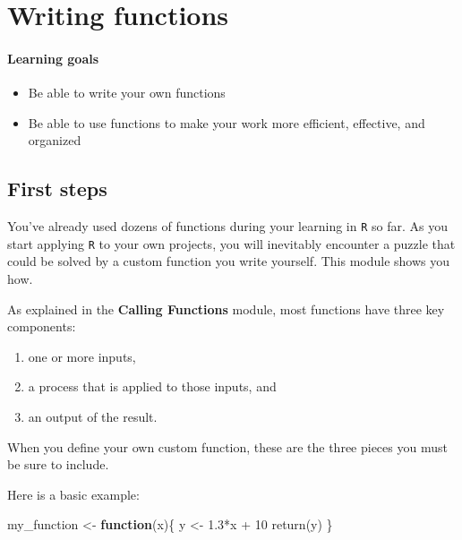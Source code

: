 \documentclass[
]{book}
\newenvironment{Shaded}{\begin{snugshade}}{\end{snugshade}}
\newcommand{\ControlFlowTok}[1]{\textcolor[rgb]{0.13,0.29,0.53}{\textbf{#1}}}
\newcommand{\DecValTok}[1]{\textcolor[rgb]{0.00,0.00,0.81}{#1}}
\newcommand{\FloatTok}[1]{\textcolor[rgb]{0.00,0.00,0.81}{#1}}
\newcommand{\FunctionTok}[1]{\textcolor[rgb]{0.00,0.00,0.00}{#1}}
\newcommand{\NormalTok}[1]{#1}
\newcommand{\OtherTok}[1]{\textcolor[rgb]{0.56,0.35,0.01}{#1}}
\newcommand{\SpecialCharTok}[1]{\textcolor[rgb]{0.00,0.00,0.00}{#1}}
\providecommand{\tightlist}{%
  \setlength{\itemsep}{0pt}\setlength{\parskip}{0pt}}
\begin{document}
\hypertarget{writing-functions}{%
\chapter{Writing functions}\label{writing-functions}}

\hypertarget{learning-goals-15}{%
\subsubsection*{Learning goals}\label{learning-goals-15}}

\begin{itemize}
\tightlist
\item
  Be able to write your own functions
\item
  Be able to use functions to make your work more efficient, effective, and organized
\end{itemize}

\hypertarget{first-steps}{%
\section*{First steps}\label{first-steps}}

You've already used dozens of functions during your learning in \texttt{R} so far. As you start applying \texttt{R} to your own projects, you will inevitably encounter a puzzle that could be solved by a custom function you write yourself. This module shows you how.

As explained in the \textbf{Calling Functions} module, most functions have three key components:

\begin{enumerate}
\def\labelenumi{(\arabic{enumi})}
\tightlist
\item
  one or more inputs,\\
\item
  a process that is applied to those inputs, and\\
\item
  an output of the result.
\end{enumerate}

When you define your own custom function, these are the three pieces you must be sure to include.

Here is a basic example:

\begin{Shaded}
\begin{Highlighting}[]
\NormalTok{my\_function }\OtherTok{\textless{}{-}} \ControlFlowTok{function}\NormalTok{(x)\{}
\NormalTok{  y }\OtherTok{\textless{}{-}} \FloatTok{1.3}\SpecialCharTok{*}\NormalTok{x }\SpecialCharTok{+} \DecValTok{10}
  \FunctionTok{return}\NormalTok{(y)}
\NormalTok{\}}
\end{Highlighting}
\end{Shaded}
\end{document}
